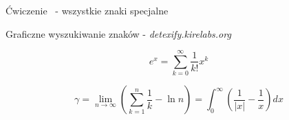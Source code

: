 \documentclass{beamer}
\theoremstyle{newblock}
\begin{document}
\begin{frame}{Ćwiczenie \showmycounter \ - wszystkie znaki specjalne}

    Graficzne wyszukiwanie znaków - \textit{detexify.kirelabs.org}
    
    \begin{examples}
        \begin{equation}
            e^x  = \sum_{k=0}^\infty \frac{1}{k!}x^k
        \end{equation}
    \end{examples}
    



    \begin{examples}
        \begin{equation}
            \gamma = \lim_{n \rightarrow \infty} ( \sum_{k=1}^{n} \frac{1}{k} - \ln n ) = \int_0^\infty(\frac{1}{|x|} - \frac{1}{x})dx
        \end{equation}
    \end{examples}
\end{frame}
\end{document}
